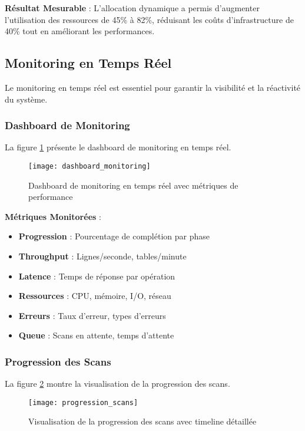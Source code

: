 \textbf{Résultat Mesurable} : L'allocation dynamique a permis d'augmenter l'utilisation des ressources de 45\% à 82\%, réduisant les coûts d'infrastructure de 40\% tout en améliorant les performances.

\subsection{Monitoring en Temps Réel}

Le monitoring en temps réel est essentiel pour garantir la visibilité et la réactivité du système.

\subsubsection{Dashboard de Monitoring}

La figure \ref{fig:dashboard_monitoring} présente le dashboard de monitoring en temps réel.

\begin{figure}[htpb]
\centering
\texttt{[image: dashboard\_monitoring]}
\caption{Dashboard de monitoring en temps réel avec métriques de performance}
\label{fig:dashboard_monitoring}
\end{figure}

\textbf{Métriques Monitorées} :
\begin{itemize}
    \item \textbf{Progression} : Pourcentage de complétion par phase
    \item \textbf{Throughput} : Lignes/seconde, tables/minute
    \item \textbf{Latence} : Temps de réponse par opération
    \item \textbf{Ressources} : CPU, mémoire, I/O, réseau
    \item \textbf{Erreurs} : Taux d'erreur, types d'erreurs
    \item \textbf{Queue} : Scans en attente, temps d'attente
\end{itemize}

\subsubsection{Progression des Scans}

La figure \ref{fig:progression_scans} montre la visualisation de la progression des scans.

\begin{figure}[htpb]
\centering
\texttt{[image: progression\_scans]}
\caption{Visualisation de la progression des scans avec timeline détaillée}
\label{fig:progression_scans}
\end{figure}

